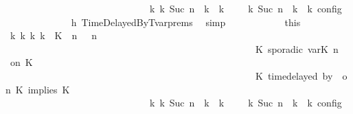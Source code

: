 \begin{isabellebody}
\ \ \ \ \ \ \ \ \ \ \ \ \ \ \ \ \ \ \ \ \ \ \ \ \ \ \ \ \ \ {\isasymhookrightarrow}\isactrlbsup k\isactrlesup \ {\isacharparenleft}{\isasymGamma}\isactrlsub k{\isacharcomma}\ Suc\ n\ {\isasymturnstile}\ {\isasymPsi}\isactrlsub k\ {\isasymtriangleright}\ {\isasymPhi}\isactrlsub k{\isacharparenright}{\isacharparenright}\ {\isasymand}\ {\isasymrho}\ {\isasymin}\ {\isasymlbrakk}\ {\isasymGamma}\isactrlsub k{\isacharcomma}\ Suc\ n\ {\isasymturnstile}\ {\isasymPsi}\isactrlsub k\ {\isasymtriangleright}\ {\isasymPhi}\isactrlsub k\ {\isasymrbrakk}\isactrlsub c\isactrlsub o\isactrlsub n\isactrlsub f\isactrlsub i\isactrlsub g{\isacartoucheclose}\isanewline
\ \ \ \ \ \ \ \ \ \ \ \ \isamarkupfalse%
\ h{}\ TimeDelayedByTvar{\isachardot}prems\ \isamarkupfalse%
\ simp\isanewline
\ \ \ \ \ \ \ \ \ \ \isamarkupfalse%
\ this\ \isamarkupfalse%
\ {\isasymGamma}\isactrlsub k\ {\isasymPsi}\isactrlsub k\ {\isasymPhi}\isactrlsub k\ k\ \ {\isacartoucheopen}{\isacharparenleft}{\isacharparenleft}{\isacharparenleft}{\isacharparenleft}K\ {\isasymUp}\ n{\isacharparenright}\ {\isacharhash}\ {\isasymGamma}{\isacharparenright}{\isacharcomma}\ n\ {\isasymturnstile}\ {\isasymPsi}\isanewline
\ \ \ \ \ \ \ \ \ \ \ \ \ \ \ \ \ \ \ \ \ \ \ \ \ \ \ \ \ \ \ \ \ \ \ \ \ \ \ \ \ \ \ \ \ \ \ \ \ \ \ {\isasymtriangleright}\ {\isacharparenleft}{\isacharparenleft}K\ sporadic{\isasymsharp}\ {\isasymlparr}{\isasymtau}\isactrlsub v\isactrlsub a\isactrlsub r{\isacharparenleft}K\ n{\isacharparenright}\ {\isasymoplus}\ {\isasymdelta}{\isasymtau}{\isasymrparr}\ on\ K\isanewline
\ \ \ \ \ \ \ \ \ \ \ \ \ \ \ \ \ \ \ \ \ \ \ \ \ \ \ \ \ \ \ \ \ \ \ \ \ \ \ \ \ \ \ \ \ \ \ \ \ \ \ {\isacharhash}\ {\isacharparenleft}K\ time{\isacharminus}delayed{\isasymsharp}\ by\ {\isasymdelta}{\isasymtau}\ on\ K\ implies\ K\ {\isacharhash}\ {\isasymPhi}{\isacharparenright}{\isacharparenright}\isanewline
\ \ \ \ \ \ \ \ \ \ \ \ \ \ \ \ \ \ \ \ \ \ \ \ \ \ \ \ \ \ {\isasymhookrightarrow}\isactrlbsup k\isactrlesup \ {\isacharparenleft}{\isasymGamma}\isactrlsub k{\isacharcomma}\ Suc\ n\ {\isasymturnstile}\ {\isasymPsi}\isactrlsub k\ {\isasymtriangleright}\ {\isasymPhi}\isactrlsub k{\isacharparenright}{\isacharparenright}{\isacartoucheclose}\ \ {\isacharasterisk}{\isacharcolon}{\isacartoucheopen}{\isasymrho}\ {\isasymin}\ {\isasymlbrakk}\ {\isasymGamma}\isactrlsub k{\isacharcomma}\ Suc\ n\ {\isasymturnstile}\ {\isasymPsi}\isactrlsub k\ {\isasymtriangleright}\ {\isasymPhi}\isactrlsub k\ {\isasymrbrakk}\isactrlsub c\isactrlsub o\isactrlsub n\isactrlsub f\isactrlsub i\isactrlsub g{\isacartoucheclose}\isanewline

\end{isabellebody}
